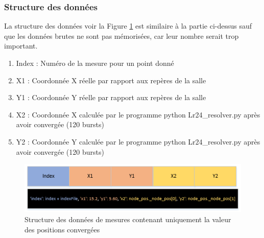 \subsubsection{Structure des données}
La structure des données voir la Figure \ref{fig:dataStruct2} est similaire à la partie ci-dessus sauf que les données brutes ne sont pas mémorisées, car leur nombre serait trop important. 

\begin{enumerate}
 \item Index : Numéro de la mesure pour un point donné
 \item X1 : Coordonnée X réelle par rapport aux repères de la salle 
 \item Y1 : Coordonnée Y réelle par rapport aux repères de la salle 
 \item X2 : Coordonnée X calculée par le programme python Lr24\_resolver.py après avoir convergée (120 bursts)
 \item Y2 : Coordonnée Y calculée par le programme python Lr24\_resolver.py après avoir convergée (120 bursts)
\end{enumerate}

\begin{figure}[htp]
 \begin{center}
  \includegraphics[scale=0.7]{figures/dataStruct2.png}
  \caption{Structure des données de mesures contenant uniquement la valeur des positions convergées}
  \label{fig:dataStruct2} %
 \end{center}
\end{figure}









